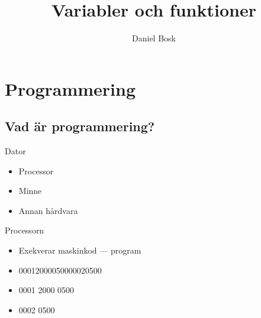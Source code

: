 \title{%
  Variabler och funktioner
}
\author{Daniel Bosk}


\mode*

\begin{abstract}
  
\end{abstract}


\section{Programmering}

\subsection{Vad är programmering?}

\begin{frame}
  \begin{block}{Dator}
    \begin{itemize}
      \item Processor
      \item Minne
      \item Annan hårdvara
    \end{itemize}
  \end{block}
\end{frame}

\begin{frame}
  \begin{block}{Processorn}
    \begin{itemize}
      \item Exekverar maskinkod --- program
    \end{itemize}
  \end{block}

  \pause

  \begin{example}
    \begin{itemize}
      \item<1-2> 00012000050000020500
      \item<3-> 0001 2000 0500
      \item<3-> 0002 0500
    \end{itemize}
  \end{example}
\end{frame}

